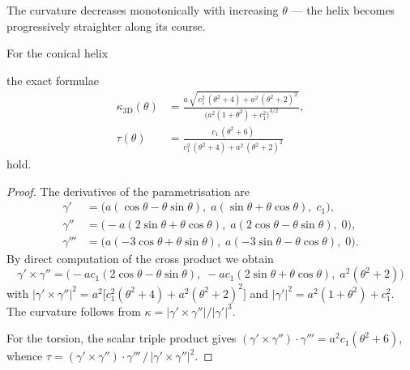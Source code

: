 The curvature decreases monotonically with increasing $\theta$ --- the helix
becomes progressively straighter along its course.

\begin{theorem}\label{thm:3d-curvature-torsion}
For the conical helix

the exact formulae
\begin{align}
\kappa_{\mathrm{3D}}(\theta)
  &= \frac{a\,\sqrt{\,c_1^2\,(\theta^2+4) + a^2\,(\theta^2+2)^2\,}}
          {\bigl(a^2(1+\theta^2) + c_1^2\bigr)^{3/2}},
\label{eq:kappa3d}\\[6pt]
\tau(\theta)
  &= \frac{c_1\,(\theta^2 + 6)}
          {c_1^2\,(\theta^2+4) + a^2\,(\theta^2+2)^2}
\label{eq:torsion}
\end{align}
hold.
\end{theorem}

\begin{proof}
The derivatives of the parametrisation are
\begin{align*}
\gamma'  &= \bigl(a(\cos\theta - \theta\sin\theta),\;
             a(\sin\theta + \theta\cos\theta),\; c_1\bigr),\\
\gamma'' &= \bigl(-a(2\sin\theta + \theta\cos\theta),\;
             a(2\cos\theta - \theta\sin\theta),\; 0\bigr),\\
\gamma'''&= \bigl(a(-3\cos\theta + \theta\sin\theta),\;
             a(-3\sin\theta - \theta\cos\theta),\; 0\bigr).
\end{align*}
By direct computation of the cross product we obtain
\[
  \gamma' \times \gamma''
  = \bigl(-ac_1(2\cos\theta - \theta\sin\theta),\;
          -ac_1(2\sin\theta + \theta\cos\theta),\;
          a^2(\theta^2+2)\bigr)
\]
with $|\gamma' \times \gamma''|^2 = a^2\bigl[c_1^2(\theta^2+4) +
a^2(\theta^2+2)^2\bigr]$ and $|\gamma'|^2 = a^2(1+\theta^2) + c_1^2$.
The curvature follows from $\kappa = |\gamma' \times \gamma''|/|\gamma'|^3$.

For the torsion, the scalar triple product gives
$(\gamma' \times \gamma'') \cdot \gamma''' = a^2 c_1(\theta^2+6)$,
whence $\tau = (\gamma' \times \gamma'') \cdot \gamma''' \,/\,
|\gamma' \times \gamma''|^2$.
\end{proof}

